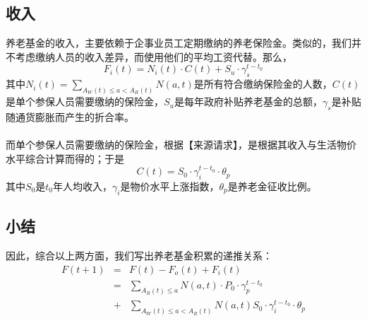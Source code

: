 \documentclass[a4paper]{article}
\begin{document}
\subsection{收入}
养老基金的收入，主要依赖于企事业员工定期缴纳的养老保险金。类似的，我们并不考虑缴纳人员的收入差异，而使用他们的平均工资代替。那么，
	\begin{equation}
		\label{pension_in}
		F_i(t) = N_i(t) \cdot C(t) + S_u \cdot \gamma_s^{t-t_0}
	\end{equation}
其中$N_i(t)=\sum_{A_W(t) \leq a < A_R(t)} N(a,t)$是所有符合缴纳保险金的人数，$C(t)$是单个参保人员需要缴纳的保险金，$S_u$是每年政府补贴养老基金的总额，$\gamma_s$是补贴随通货膨胀而产生的折合率。\\\\
\indent
而单个参保人员需要缴纳的保险金，根据【来源请求】，是根据其收入与生活物价水平综合计算而得的；于是
	\begin{equation}
		\label{pension_per_in}
		C(t) = S_0 \cdot \gamma_i^{t-t_0} \cdot \theta_p
	\end{equation}
其中$S_0$是$t_0$年人均收入，$\gamma_i$是物价水平上涨指数，$\theta_p$是养老金征收比例。
\subsection*{小结}
因此，综合以上两方面，我们写出养老基金积累的递推关系：
	\begin{eqnarray}
		\label{pension_io}
		F(t+1) &=& F(t) - F_o(t) + F_i(t) \\
					&=& \sum_{A_R(t) \leq a} N(a,t) \cdot P_0 \cdot \gamma_p^{t-t_0} \nonumber \\
					&+& \sum_{A_W(t) \leq a < A_R(t)} N(a,t) S_0 \cdot \gamma_i^{t-t_0} \cdot \theta_p
	\end{eqnarray}
\end{document}
